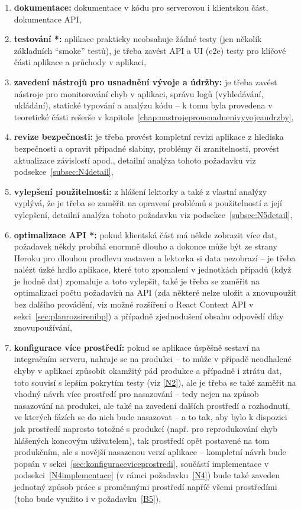 \begin{enumerate}[label=\textbf{N\arabic*}]
    \item \label{N1} \textbf{dokumentace:} dokumentace v kódu pro serverovou i klientskou část, dokumentace API,
    \item \label{N2} \textbf{testování *:} aplikace prakticky neobsahuje žádné testy (jen několik základních \enquote{smoke} testů), je třeba zavést API a UI (e2e) testy pro klíčové části aplikace a průchody v aplikaci,
    \item \label{N3} \textbf{zavedení nástrojů pro usnadnění vývoje a údržby:} je třeba zavést nástroje pro monitorování chyb v aplikaci, správu logů (vyhledávání, ukládání), statické typování a analýzu kódu -- k tomu byla provedena v teoretické části rešerše v kapitole~\ref{chap:nastrojeprousnadnenivyvojeaudrzby},
    \item \label{N4} \textbf{revize bezpečnosti:} je třeba provést kompletní revizi aplikace z hlediska bezpečnosti a opravit případné slabiny, problémy či zranitelnosti, provést aktualizace závislostí apod., detailní analýza tohoto požadavku viz podsekce~\ref{subsec:N4detail},
    \item \label{N5} \textbf{vylepšení použitelnosti:} z hlášení lektorky a také z vlastní analýzy vyplývá, že je třeba se zaměřit na opravení problémů s použitelností a její vylepšení, detailní analýza tohoto požadavku viz podsekce~\ref{subsec:N5detail},
    \item \label{N6} \textbf{optimalizace API *:} pokud klientská část má někde zobrazit více dat, požadavek někdy probíhá enormně dlouho a dokonce může být ze strany Heroku pro dlouhou prodlevu zastaven a lektorka si data nezobrazí -- je třeba nalézt úzké hrdlo aplikace, které toto zpomalení v jednotkách případů (když je hodně dat) zpomaluje a toto vylepšit, také je třeba se zaměřit na optimalizaci počtu požadavků na API (zda některé nelze uložit a znovupoužít bez dalšího provádění, viz možné rozšíření o React Context API v sekci~\ref{sec:planrozsirenibp}) a případně zjednodušení obsahu odpovědí díky znovupoužívání,
    \item \label{N7} \textbf{konfigurace více prostředí:} pokud se aplikace úspěšně sestaví na integračním serveru, nahraje se na produkci \cite{bp} -- to může v případě neodhalené chyby v aplikaci způsobit okamžitý pád produkce a případně i ztrátu dat, toto souvisí s lepším pokrytím testy (viz \ref{N2}), ale je třeba se také zaměřit na vhodný návrh více prostředí pro nasazování -- tedy nejen na způsob nasazování na produkci, ale také na zavedení dalších prostředí a rozhodnutí, ve kterých fázích se do nich bude nasazovat -- a to tak, aby bylo k dispozici jak prostředí naprosto totožné s produkcí (např. pro reprodukování chyb hlášených koncovým uživatelem), tak prostředí opět postavené na tom produkčním, ale s novější nasazenou verzí aplikace -- kompletní návrh bude popsán v sekci~\ref{sec:konfiguraceviceprostredi}, součástí implementace v podsekci~\ref{N4implementace} (v rámci požadavku~\ref{N4}) bude také zaveden jednotný způsob práce s proměnnými prostředí napříč všemi prostředími (toho bude využito i v požadavku~\ref{B5}),

\end{enumerate}
